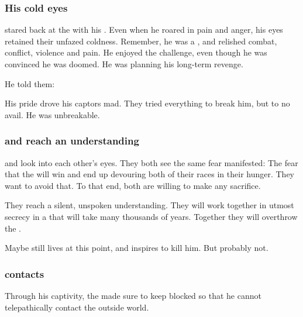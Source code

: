 \subsubsection{His cold eyes}
\Nexagglachel stared back at the \resphain with his . 
Even when he roared in pain and anger, his eyes retained their unfazed coldness. 
Remember, he was a \dragon, and \dragons relished combat, conflict, violence and pain. 
He enjoyed the challenge, even though he was convinced he was doomed. 
He was planning his long-term revenge. 

He told them: 

His pride drove his captors mad. 
They tried everything to break him, but to no avail. 
He was unbreakable. 





\subsubsection{\Nexagglachel and \Azraid reach an understanding}
\Nexagglachel{} and \Azraid{} look into each other's eyes. 
They both see the same fear manifested: 
The fear that the \banes{} will win and end up devouring both of their races in their hunger. 
They want to avoid that. 
To that end, both are willing to make any sacrifice. 

They reach a silent, unspoken understanding. 
They will work together in utmost secrecy in a \XanatosGambit{} that will take many thousands of years. 
Together they will overthrow the \banes. 

Maybe \Damiarch{} still lives at this point, and \Nexagglachel{} inspires \Azraid{} to kill him. 
But probably not. 





\subsubsection{\Nexagglachel contacts \Ishnaruchaefir}
Through his captivity, the \resphain{} made sure to keep \Nexagglachel{} blocked so that he cannot telepathically contact the outside world. 

